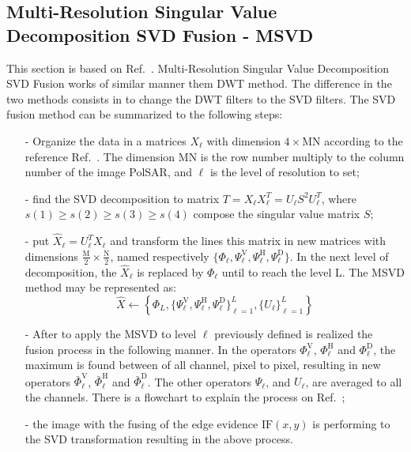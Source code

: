\documentclass[journal]{IEEEtran}
\begin{document}
\subsection{Multi-Resolution Singular Value Decomposition SVD Fusion - MSVD}
This section is based on Ref.~\cite{naidu}. Multi-Resolution Singular Value Decomposition SVD Fusion works of similar manner them DWT method.  The difference in the two methods consists in to change the DWT filters to the SVD filters. The SVD fusion method can be summarized to the following steps:
\begin{itemize}
\item[-] Organize the data in a matrices $X_\ell$ with dimension $4\times\text{MN}$ according to the reference Ref.~\cite{naidu}. The dimension MN is the row number multiply to the  column number of the image PolSAR, and $\ell$ is the level of resolution to set;  
\item[-] find the SVD decomposition to matrix $T=X_\ell X_\ell^T=U_\ell S^2 U_\ell^T$, where $s(1)\geq s(2) \geq s(3) \geq s(4)$ compose the singular value matrix $S$;
\item[-] put $\widehat{X}_\ell=U_\ell^TX_\ell$ and transform the lines this matrix in new matrices with dimensions $\frac{\text{M}}{2}\times\frac{\text{N}}{2}$, named respectively $\{\Phi_\ell, \Psi_\ell^\text{V}, \Psi_\ell^\text{H}, \Psi_\ell^\text{D}\}$. In the next level of decomposition, the $\widehat{X}_\ell$ is replaced by $\Phi_\ell$ until to reach the level L. The MSVD method may be represented as:
\begin{equation}\label{msvd_iter}
\widehat{X}\leftarrow \left\{\Phi_L,\{\Psi_\ell^\text{V},\Psi_\ell^\text{H},\Psi_\ell^\text{D} \}_{\ell=1}^L,\{U_\ell\}_{\ell=1}^L \right\}
\end{equation}
\item[-] After to apply the MSVD to level $\ell$ previously defined is realized the fusion process in the following manner. In the operators $\Phi_\ell^\text{V}$, $\Phi_\ell^\text{H}$ and $\Phi_\ell^\text{D}$, the maximum is found between of all channel, pixel to pixel, resulting in new operators $\bar{\Phi}_\ell^\text{V}$, $\bar{\Phi}_\ell^\text{H}$ and $\bar{\Phi}_\ell^\text{D}$. The other operators $\Psi_\ell$, and $U_\ell$, are averaged to all the channels. There is a  flowchart to  explain the process on Ref.~\cite{naidu};
\item[-] the image with the fusing of the edge evidence $\text{IF}(x,y)$ is performing to the SVD transformation resulting in the above process. 
\end{itemize}
\end{document}
